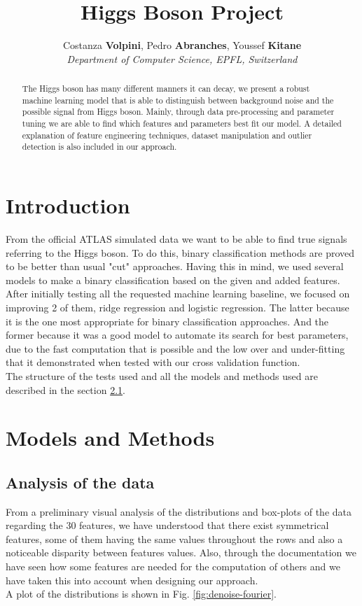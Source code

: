\documentclass[10pt,conference,compsocconf]{IEEEtran}
\begin{document}
\title{Higgs Boson Project}

\author{
  Costanza \textbf{Volpini}, Pedro \textbf{Abranches}, Youssef \textbf{Kitane}\\
  \textit{Department of Computer Science, EPFL, Switzerland}
}

\maketitle

\begin{abstract}
    The Higgs boson has many different manners it can decay, we present a robust machine learning model that is able to distinguish between background noise and the possible signal from Higgs boson. Mainly, through data pre-processing and parameter tuning we are able to find which features and parameters best fit our model. A detailed explanation of feature engineering techniques, dataset manipulation and outlier detection is also included in our approach.
\end{abstract}

\section{Introduction}
    From the official ATLAS simulated data we want to be able to find true signals referring to the Higgs boson. To do this, binary classification methods are proved to be better than usual "cut" approaches. Having this in mind, we used several models to make a binary classification based on the given and added features. \\
    After initially testing all the requested machine learning baseline, we focused on improving 2 of them, ridge regression and logistic regression. The latter because it is the one most appropriate for binary classification approaches. And the former because it was a good model to automate its search for best parameters, due to the fast computation that is possible and the low over and under-fitting that it demonstrated when tested with our cross validation function. \\
    The structure of the tests used and all the models and methods used are described in the section \ref{sec:models}. 

\section{Models and Methods}
\subsection{Analysis of the data} \label{sec:models}
From a preliminary visual analysis of the distributions and box-plots of the data regarding the 30 features, we have understood that there exist symmetrical features, some of them having the same values throughout the rows and also a noticeable disparity between features values. Also, through the documentation we have seen how some features are needed for the computation of others and we have taken this into account when designing our approach. \\
A plot of the distributions is shown in Fig. \ref{fig:denoise-fourier}.
\end{document}
